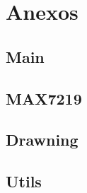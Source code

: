 \documentclass{article}
\def\blankpage{%
      \clearpage%
      \thispagestyle{empty}%
      \addtocounter{page}{-1}%
      \null%
      \clearpage}
\begin{document}
\section{Anexos}

\subsection{Main}


\subsection{MAX7219}


\subsection{Drawning}


\subsection{Utils}


\blankpage
\end{document}
